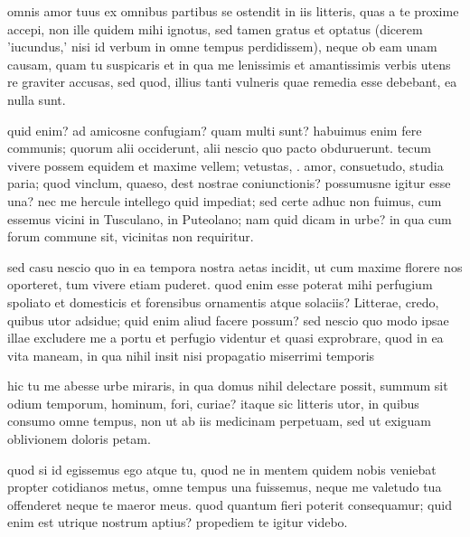


 omnis amor tuus ex omnibus partibus se ostendit in iis litteris, quas a te proxime accepi, non ille quidem mihi ignotus, sed tamen gratus et optatus (dicerem 'iucundus,' nisi id verbum in omne tempus perdidissem), neque ob eam unam causam, quam tu suspicaris et in qua me lenissimis et amantissimis verbis utens re graviter accusas, sed quod, illius tanti vulneris quae remedia esse debebant, ea nulla sunt.

 quid enim? ad amicosne confugiam? quam multi sunt? habuimus enim fere communis; quorum alii occiderunt, alii nescio quo pacto obduruerunt. tecum vivere possem equidem et maxime vellem; vetustas, . amor, consuetudo, studia paria; quod vinclum, quaeso, dest nostrae coniunctionis? possumusne igitur esse una? nec me hercule intellego quid impediat; sed certe adhuc non fuimus, cum essemus vicini in Tusculano, in Puteolano; nam quid dicam in urbe? in qua cum forum commune sit, vicinitas non requiritur.

 sed casu nescio quo in ea tempora nostra aetas incidit, ut cum maxime florere nos oporteret, tum vivere etiam puderet. quod enim esse poterat mihi perfugium spoliato et domesticis et forensibus ornamentis atque solaciis? Litterae, credo, quibus utor adsidue; quid enim aliud facere possum? sed nescio quo modo ipsae illae excludere me a portu et perfugio videntur et quasi exprobrare, quod in ea vita maneam, in qua nihil insit nisi propagatio miserrimi temporis

 hic tu me abesse urbe miraris, in qua domus nihil delectare possit, summum sit odium temporum, hominum, fori, curiae? itaque sic litteris utor, in quibus consumo omne tempus, non ut ab iis medicinam perpetuam, sed ut exiguam oblivionem doloris petam.

 quod si id egissemus ego atque tu, quod ne in mentem quidem nobis veniebat propter cotidianos metus, omne tempus una fuissemus, neque me valetudo tua offenderet neque te maeror meus. quod quantum fieri poterit consequamur; quid enim est utrique nostrum aptius? propediem te igitur videbo.
